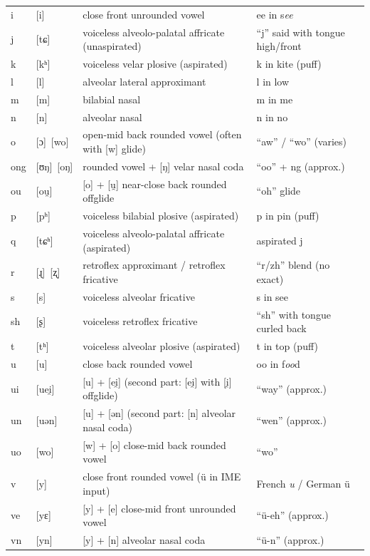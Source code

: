 \begin{table}[H]
\begin{singlespace*}
{\begin{tabular}{llll}
				i   & [i]       & close front unrounded vowel & ee in s\emph{ee} \\
				j   & [tɕ]      & voiceless alveolo-palatal affricate (unaspirated) & ``j'' said with tongue high/front \\
				k   & [kʰ]      & voiceless velar plosive (aspirated) & k in kite (puff) \\
				l   & [l]       & alveolar lateral approximant & l in low \\
				m   & [m]       & bilabial nasal & m in me \\
				n   & [n]       & alveolar nasal & n in no \\

				o   & [ɔ]~[wo]  & open-mid back rounded vowel (often with [w] glide) & ``aw'' / ``wo'' (varies) \\
				ong & [ʊŋ]~[oŋ] & rounded vowel + [ŋ] velar nasal coda & ``oo'' + ng (approx.) \\
				ou  & [ou̯]      & [o] + [u̯] near-close back rounded offglide & ``oh'' glide \\

				p   & [pʰ]      & voiceless bilabial plosive (aspirated) & p in pin (puff) \\
				q   & [tɕʰ]     & voiceless alveolo-palatal affricate (aspirated) & aspirated j \\
				r   & [ɻ]~[ʐ]   & retroflex approximant / retroflex fricative & ``r/zh'' blend (no exact) \\
				s   & [s]       & voiceless alveolar fricative & s in see \\
				sh  & [ʂ]       & voiceless retroflex fricative & ``sh'' with tongue curled back \\
				t   & [tʰ]      & voiceless alveolar plosive (aspirated) & t in top (puff) \\

				u   & [u]       & close back rounded vowel & oo in f\emph{oo}d \\
				ui  & [uei̯]    & [u] + [ei̯] (second part: [ei̯] with [i̯] offglide) & ``way'' (approx.) \\
				un  & [uən]     & [u] + [ən] (second part: [n] alveolar nasal coda) & ``wen'' (approx.) \\
				uo  & [wo]      & [w] + [o] close-mid back rounded vowel & ``wo'' \\

				v   & [y]       & close front rounded vowel (ü in IME input) & French \emph{u} / German ü \\
				ve  & [yɛ]      & [y] + [e] close-mid front unrounded vowel & ``ü-eh'' (approx.) \\
				vn  & [yn]      & [y] + [n] alveolar nasal coda & ``ü-n'' (approx.) \\


\end{tabular}}
\end{singlespace*}
\end{table}

